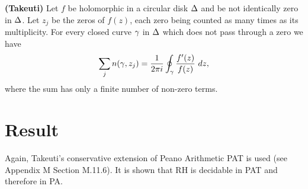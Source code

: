 \documentclass[12pt]{article}
\begin{document}
\begin{lemma}{\bf (Takeuti)}\cite[Theorem 4.5.6]{tak}
\label{tak4.5.6}
Let $f$ be holomorphic in a circular disk $\Delta$ and be not identically zero in $\Delta$. Let $z_j$ be the zeros of $f(z)$, each zero being counted as many times as its multiplicity. For every closed curve $\gamma$ in $\Delta$ which does not pass through a zero we have 
$$
\sum_j n(\gamma,z_j)= \frac{1}{2\pi i} \oint_\gamma \frac{f'(z)}{f(z)}~dz,
$$
where the sum has only a finite number of non-zero terms.
\end{lemma}

\section{Result}
\label{res}

Again, Takeuti's conservative extension of Peano Arithmetic PAT is used (see Appendix M Section M.11.6). It is shown that RH is decidable in PAT and therefore in PA.\par
\end{document}
